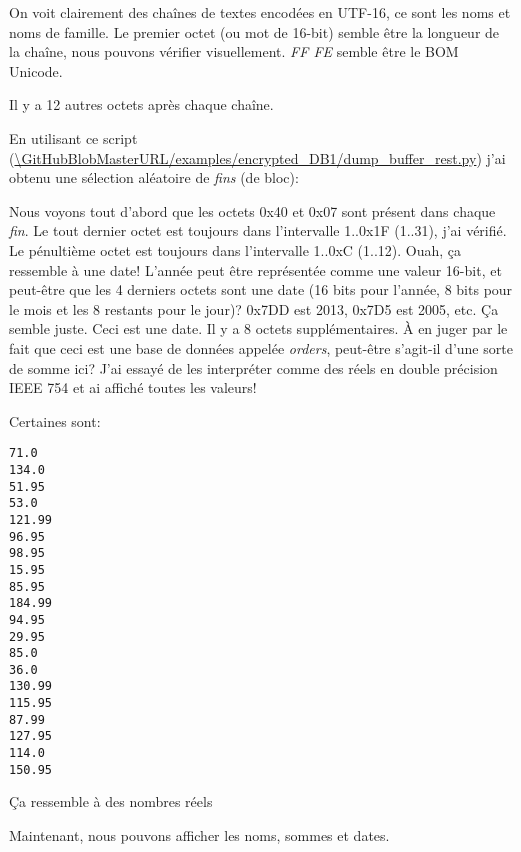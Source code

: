 On voit clairement des chaînes de textes encodées en UTF-16, ce sont les noms et
noms de famille.
Le premier octet (ou mot de 16-bit) semble être la longueur de la chaîne, nous pouvons
vérifier visuellement.
\emph{FF FE} semble être le \ac{BOM} Unicode.

Il y a 12 autres octets après chaque chaîne.

En utilisant ce script
(\url{\GitHubBlobMasterURL/examples/encrypted_DB1/dump_buffer_rest.py})
j'ai obtenu une sélection aléatoire de \emph{fins} (de bloc):



Nous voyons tout d'abord que les octets 0x40 et 0x07 sont présent dans chaque \emph{fin}.
Le tout dernier octet est toujours dans l'intervalle 1..0x1F (1..31), j'ai vérifié.
Le pénultième octet est toujours dans l'intervalle 1..0xC (1..12).
Ouah, ça ressemble à une date!
L'année peut être représentée comme une valeur 16-bit, et peut-être que les 4 derniers
octets sont une date (16 bits pour l'année, 8 bits pour le mois et les 8 restants
pour le jour)?
0x7DD est 2013, 0x7D5 est 2005, etc. Ça semble juste. Ceci est une date.
Il y a 8 octets supplémentaires.
À en juger par le fait que ceci est une base de données appelée \emph{orders}, peut-être
s'agit-il d'une sorte de somme ici?
J'ai essayé de les interpréter comme des réels en double précision IEEE 754 et ai
affiché toutes les valeurs!

Certaines sont:

\begin{lstlisting}
71.0
134.0
51.95
53.0
121.99
96.95
98.95
15.95
85.95
184.99
94.95
29.95
85.0
36.0
130.99
115.95
87.99
127.95
114.0
150.95
\end{lstlisting}

Ça ressemble à des nombres réels

Maintenant, nous pouvons afficher les noms, sommes et dates.


